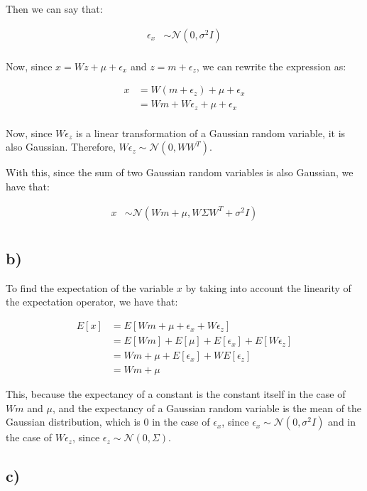 \documentclass[12pt,a4paper,oneside]{paper}
\begin{document}
Then we can say that:

\begin{align*}
    \epsilon_x &\sim \mathcal{N}(0, \sigma^2 I) \\
\end{align*}

Now, since \( x = Wz + \mu + \epsilon_x \) and $z = m + \epsilon_z$, we can rewrite the expression as:

\begin{align*}
    x &= W(m + \epsilon_z) + \mu + \epsilon_x \\
    &= Wm + W\epsilon_z + \mu + \epsilon_x \\
\end{align*}

Now, since \( W\epsilon_z \) is a linear transformation of a Gaussian random variable, it is also Gaussian.
Therefore, \( W\epsilon_z \sim \mathcal{N}(0, WW^T) \). 

With this, since the sum of two Gaussian random variables is also Gaussian, we have that:

\begin{align*}
    x &\sim \mathcal{N}(Wm + \mu, W \Sigma W^T + \sigma^2 I) \\
\end{align*}

\subsection*{b)}

To find the expectation of the variable $x$ by taking into account the linearity of the expectation operator, we have that:

\begin{align*}
    E[x] &= E[Wm + \mu + \epsilon_x + W\epsilon_z] \\
    &= E[Wm] + E[\mu] + E[\epsilon_x] + E[W\epsilon_z] \\
    &= Wm + \mu + E[\epsilon_x] + W E[\epsilon_z] \\
    &= Wm + \mu
\end{align*}

This, because the expectancy of a constant is the constant itself in the case of $Wm$ and $\mu$, and the expectancy of a Gaussian random variable is the mean of the Gaussian distribution,
which is 0 in the case of $\epsilon_x$, since $\epsilon_x \sim \mathcal{N}(0, \sigma^2 I)$ and in the case of $W\epsilon_z$, since $\epsilon_z \sim \mathcal{N}(0, \Sigma)$.

\subsection*{c)}
\end{document}
